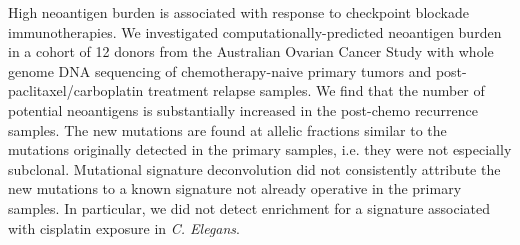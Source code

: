 High neoantigen burden is associated with response to checkpoint blockade immunotherapies. We investigated computationally-predicted neoantigen burden in a cohort of 12 donors from the Australian Ovarian Cancer Study with whole genome DNA sequencing of chemotherapy-naive primary tumors and post-paclitaxel/carboplatin treatment relapse samples. We find that the number of potential neoantigens is substantially increased in the post-chemo recurrence samples. The new mutations are found at allelic fractions similar to the mutations originally detected in the primary samples, i.e. they were not especially subclonal. Mutational signature deconvolution did not consistently attribute the new mutations to a known signature not already operative in the primary samples. In particular, we did not detect enrichment for a signature associated with cisplatin exposure in \textit{C. Elegans}.

